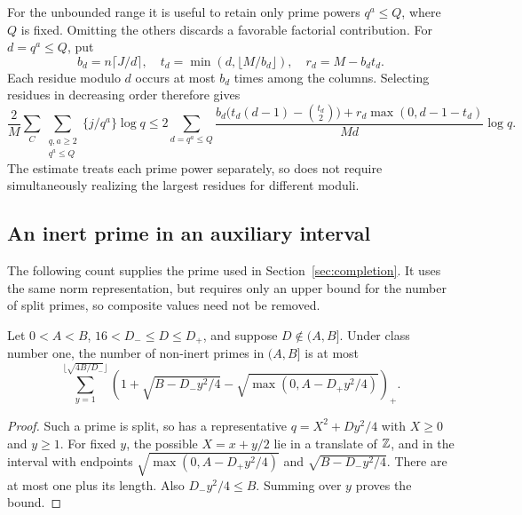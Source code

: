 For the unbounded range it is useful to retain only prime powers
$q^a\leq Q$, where $Q$ is fixed. Omitting the others discards a favorable
factorial contribution. For $d=q^a\leq Q$, put
\[
 b_d=n\lceil J/d\rceil,\quad
 t_d=\min(d,\lfloor M/b_d\rfloor),\quad r_d=M-b_dt_d.
\]
Each residue modulo $d$ occurs at most $b_d$ times among the columns.
Selecting residues in decreasing order therefore gives
\begin{equation}\label{eq:power-capacity}
 \frac2M\sum_C\sum_{\substack{q,a\geq2\\q^a\leq Q}}
       \{j/q^a\}\log q
 \leq2\sum_{d=q^a\leq Q}
 \frac{b_d\bigl(t_d(d-1)-\binom{t_d}{2}\bigr)
              +r_d\max(0,d-1-t_d)}{Md}\log q.
\end{equation}
The estimate treats each prime power separately, so does not require
simultaneously realizing the largest residues for different moduli.

\subsection{An inert prime in an auxiliary interval}\label{app:auxiliary-prime}
The following count supplies the prime used in Section~\ref{sec:completion}.
It uses the same norm representation, but requires only an upper bound
for the number of split primes, so composite values need not be removed.
\begin{lemma}\label{lem:auxiliary-count}
Let $0<A<B$, $16<D_-\leq D\leq D_+$, and suppose $D\notin(A,B]$.
Under class number one, the number of non-inert primes in $(A,B]$ is at most
\begin{equation}\label{eq:auxiliary-count}
 \sum_{y=1}^{\lfloor\sqrt{4B/D_-}\rfloor}
 \left(1+\sqrt{B-D_-y^2/4}
       -\sqrt{\max(0,A-D_+y^2/4)}\right)_+.
\end{equation}
\end{lemma}
\begin{proof}
Such a prime is split, so has a representative
$q=X^2+Dy^2/4$ with $X\geq0$ and $y\geq1$.
For fixed $y$, the possible $X=x+y/2$ lie in a translate of $\mathbb Z$,
and in the interval with endpoints
$\sqrt{\max(0,A-D_+y^2/4)}$ and $\sqrt{B-D_-y^2/4}$.
There are at most one plus its length. Also $D_-y^2/4\leq B$.
Summing over $y$ proves the bound.
\end{proof}

